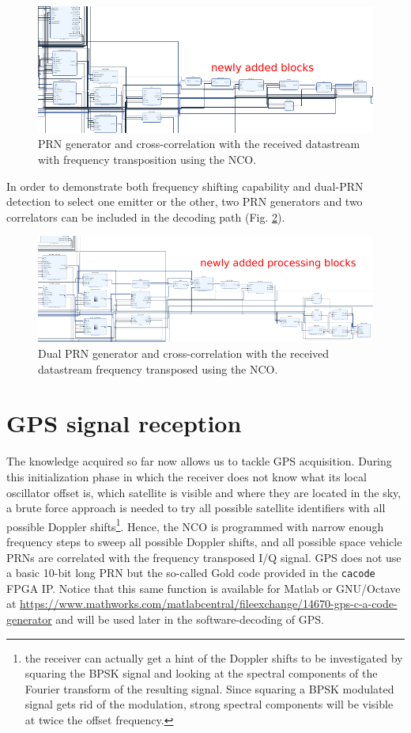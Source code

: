\documentclass{article}
\begin{document}
\begin{figure}[h!tb]
\includegraphics[width=\linewidth]{1xcorr_1PRN_NCO_crop.pdf}
\caption{PRN generator and cross-correlation with the received datastream with frequency
transposition using the NCO.}
\label{ex2}
\end{figure}

In order to demonstrate both frequency shifting capability and dual-PRN detection to select
one emitter or the other, two PRN generators and two correlators can be included in the
decoding path (Fig. \ref{ex3}).

\begin{figure}[h!tb]
\includegraphics[width=\linewidth]{2xcorr_2PRN_NCO_crop.pdf}
\caption{Dual PRN generator and cross-correlation with the received datastream frequency
transposed using the NCO.}
\label{ex3}
\end{figure}

\section{GPS signal reception}

The knowledge acquired so far now allows us to tackle GPS acquisition. During this
initialization phase in which the receiver does not know what its local oscillator offset is,
which satellite is visible and where they are located in the sky, a brute force approach is needed
to try all possible satellite identifiers with all possible Doppler shifts\footnote{the receiver
can actually get a hint of the Doppler shifts to be investigated by squaring the BPSK signal
and looking at the spectral components of the Fourier transform of the resulting signal. Since
squaring a BPSK modulated signal gets rid of the modulation, strong spectral components will be
visible at twice the offset frequency.}. Hence, the NCO is programmed with narrow enough frequency
steps to sweep all possible Doppler shifts, and all possible space vehicle PRNs are correlated
with the frequency transposed I/Q signal. GPS does not use a basic 10-bit long PRN but the so-called
Gold code provided in the {\tt cacode} FPGA IP. Notice that this same function is available for
Matlab or GNU/Octave at \url{https://www.mathworks.com/matlabcentral/fileexchange/14670-gps-c-a-code-generator}
and will be used later in the software-decoding of GPS.
\end{document}
